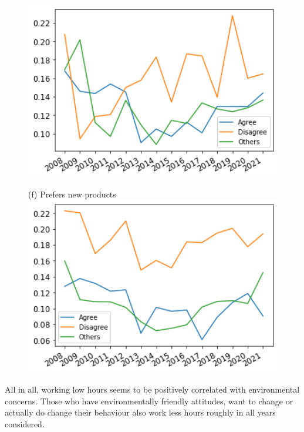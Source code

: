 \documentclass[12pt]{article}
\begin{document}
\begin{figure}[h!!]
\begin{minipage}[h!!]{0.32\textwidth}
		\includegraphics[width=1\textwidth]{../codding_data/results/liss/broad_groups_work_redcuctionqk20a144_actual.png}
	\end{minipage}
	\begin{minipage}[h!!]{0.32\textwidth}  
	\centering\footnotesize{(f) Prefers new products}
	\includegraphics[width=1\textwidth]{../codding_data/results/liss/broad_groups_work_redcuctionqk20a148_actual.png}
\end{minipage}
\end{figure}




All in all, working low hours seems to be positively correlated with environmental concerns. Those who have environmentally friendly attitudes, want to change or actually do change their behaviour also work less hours roughly in all years considered. 
\end{document}
